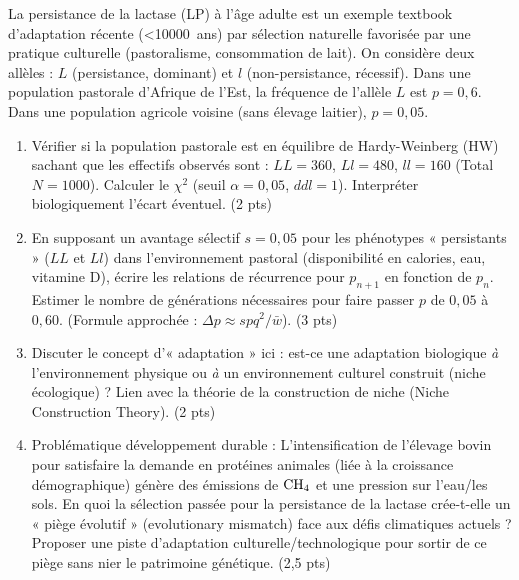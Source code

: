 \documentclass[11pt]{article}
\begin{document}
\begin{exercice}
La persistance de la lactase (LP) à l'âge adulte est un exemple textbook d'adaptation récente (\textless \SI{10000}{ans}) par sélection naturelle favorisée par une pratique culturelle (pastoralisme, consommation de lait). On considère deux allèles : $L$ (persistance, dominant) et $l$ (non-persistance, récessif). Dans une population pastorale d'Afrique de l'Est, la fréquence de l'allèle $L$ est $p = 0,6$. Dans une population agricole voisine (sans élevage laitier), $p = 0,05$.

\begin{enumerate}
    \item Vérifier si la population pastorale est en équilibre de Hardy-Weinberg (HW) sachant que les effectifs observés sont : $LL = 360$, $Ll = 480$, $ll = 160$ (Total $N=1000$). Calculer le $\chi^2$ (seuil $\alpha=0,05$, $ddl=1$). Interpréter biologiquement l'écart éventuel. (2 pts)
    \item En supposant un avantage sélectif $s = 0,05$ pour les phénotypes « persistants » ($LL$ et $Ll$) dans l'environnement pastoral (disponibilité en calories, eau, vitamine D), écrire les relations de récurrence pour $p_{n+1}$ en fonction de $p_n$. Estimer le nombre de générations nécessaires pour faire passer $p$ de $0,05$ à $0,60$. (Formule approchée : $\Delta p \approx spq^2 / \bar{w}$). (3 pts)
    \item Discuter le concept d'« adaptation » ici : est-ce une adaptation biologique \textit{à} l'environnement physique ou \textit{à} un environnement culturel construit (niche écologique) ? Lien avec la théorie de la construction de niche (Niche Construction Theory). (2 pts)
    \item Problématique développement durable : L'intensification de l'élevage bovin pour satisfaire la demande en protéines animales (liée à la croissance démographique) génère des émissions de $\ce{CH4}$ et une pression sur l'eau/les sols. En quoi la sélection passée pour la persistance de la lactase crée-t-elle un « piège évolutif » (evolutionary mismatch) face aux défis climatiques actuels ? Proposer une piste d'adaptation culturelle/technologique pour sortir de ce piège sans nier le patrimoine génétique. (2,5 pts)
\end{enumerate}
\end{exercice}
\end{document}
